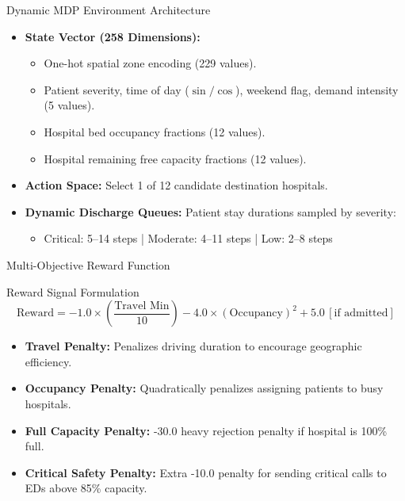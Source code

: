 \documentclass[aspectratio=169, 10pt]{beamer}
\begin{document}
\begin{frame}{Dynamic MDP Environment Architecture}
    \begin{itemize}
        \item \textbf{State Vector (258 Dimensions):}
        \begin{itemize}
            \item One-hot spatial zone encoding (229 values).
            \item Patient severity, time of day ($\sin/\cos$), weekend flag, demand intensity (5 values).
            \item Hospital bed occupancy fractions (12 values).
            \item Hospital remaining free capacity fractions (12 values).
        \end{itemize}
        \item \textbf{Action Space:} Select 1 of 12 candidate destination hospitals.
        \item \textbf{Dynamic Discharge Queues:} Patient stay durations sampled by severity:
        \begin{itemize}
            \item Critical: 5--14 steps \quad | \quad Moderate: 4--11 steps \quad | \quad Low: 2--8 steps
        \end{itemize}
    \end{itemize}
\end{frame}

\begin{frame}{Multi-Objective Reward Function}
    \begin{block}{Reward Signal Formulation}
        $$\text{Reward} = -1.0 \times \left(\frac{\text{Travel Min}}{10}\right) - 4.0 \times (\text{Occupancy})^2 + 5.0 \, [\text{if admitted}]$$
    \end{block}

    \vspace{0.2cm}
    \begin{itemize}
        \item \textbf{Travel Penalty:} Penalizes driving duration to encourage geographic efficiency.
        \item \textbf{Occupancy Penalty:} Quadratically penalizes assigning patients to busy hospitals.
        \item \textbf{Full Capacity Penalty:} -30.0 heavy rejection penalty if hospital is 100\% full.
        \item \textbf{Critical Safety Penalty:} Extra -10.0 penalty for sending critical calls to EDs above 85\% capacity.
    \end{itemize}
\end{frame}
\end{document}
